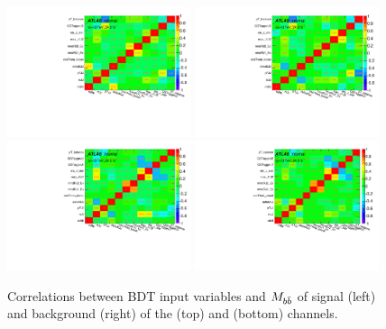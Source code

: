 \begin{figure}[htbp]
  \centering
 \includegraphics[width=0.48\textwidth]{figures/VBF/BDT_VBF_var_cor_2cen.pdf}
 \includegraphics[width=0.48\textwidth]{figures/VBF/BDT_data_var_cor_2cen.pdf}\\
 \includegraphics[width=0.48\textwidth]{figures/VBF/BDT_VBF_var_cor_4cen.pdf}
 \includegraphics[width=0.48\textwidth]{figures/VBF/BDT_data_var_cor_4cen.pdf}\\
\caption{Correlations between BDT input variables and $M_{b\bar{b}}$ of signal (left) and background (right) of  the \twocentral (top) and \fourcentral (bottom) channels.}
  \label{fig:vbf-BDTInputsCor}
\end{figure}

